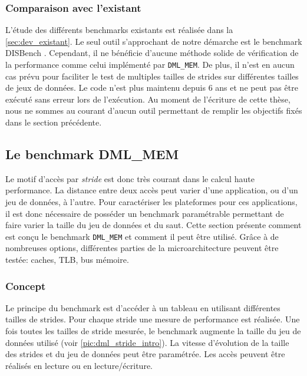     
    \subsubsection{Comparaison avec l'existant}
        L'étude des différents benchmarks existants est réalisée dans la \autoref{sec:dev_existant}. Le seul outil s'approchant de notre démarche est le benchmark DISBench \cite{disbench}. Cependant, il ne bénéficie d'aucune méthode solide de vérification de la performance comme celui implémenté par \verb=DML_MEM=. De plus, il n'est en aucun cas prévu pour faciliter le test de multiples tailles de strides sur différentes tailles de jeux de données. Le code n'est plus maintenu depuis 6 ans et ne peut pas être exécuté sans erreur lors de l'exécution. Au moment de l'écriture de cette thèse, nous ne sommes au courant d'aucun outil permettant de remplir les objectifs fixés dans le section précédente. 


\subsection{Le benchmark DML\_MEM}
    Le motif d'accès par \textit{stride} est donc très courant dans le calcul haute performance. La distance entre deux accès peut varier d'une application, ou d'un jeu de données, à l'autre. Pour caractériser les plateformes pour ces applications, il est donc nécessaire de posséder un benchmark paramétrable permettant de faire varier la taille du jeu de données et du saut. Cette section présente comment est conçu le benchmark \verb=DML_MEM= et comment il peut être utilisé. Grâce à de nombreuses options, différentes parties de la microarchitecture peuvent être testée: caches, TLB, bus mémoire.


    \subsubsection{Concept}
        
        Le principe du benchmark est d'accéder à un tableau en utilisant différentes tailles de strides. Pour chaque stride une mesure de performance est réalisée. Une fois toutes les tailles de stride mesurée, le benchmark augmente la taille du jeu de données utilisé (voir \autoref{pic:dml_stride_intro}). La vitesse d'évolution de la taille des strides et du jeu de données peut être paramétrée. Les accès peuvent être réalisés en lecture ou en lecture/écriture.
       
